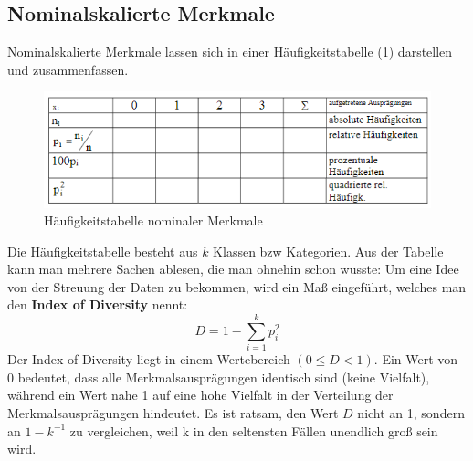 \subsection{Nominalskalierte Merkmale}
Nominalskalierte Merkmale lassen sich in einer Häufigkeitstabelle (\ref{fig:haeufigkeitstabelle-nominale-merkmale}) darstellen und zusammenfassen.
\begin{figure}[h]
    \centering
    \includegraphics[width=\textwidth]{haeufigkeitstabelle-nominale-merkmale}
    \caption{Häufigkeitstabelle nominaler Merkmale}
    \label{fig:haeufigkeitstabelle-nominale-merkmale}
\end{figure}
\newline
Die Häufigkeitstabelle besteht aus $k$ Klassen bzw Kategorien. \newline
Aus der Tabelle kann man mehrere Sachen ablesen, die man ohnehin schon wusste:
Um eine Idee von der Streuung der Daten zu bekommen, wird ein Maß eingeführt, welches man den \textbf{Index of Diversity} nennt:
\[D = 1 - \sum_{i=1}^{k} p_i^2\]
Der Index of Diversity liegt in einem Wertebereich $(0 \leq D < 1)$.
Ein Wert von 0 bedeutet, dass alle Merkmalsausprägungen identisch sind (keine Vielfalt), während ein Wert nahe 1 auf eine hohe Vielfalt in der Verteilung der Merkmalsausprägungen hindeutet.
Es ist ratsam, den Wert $D$ nicht an 1, sondern an $1- k^{-1}$ zu vergleichen, weil k in den seltensten Fällen unendlich groß sein wird.

